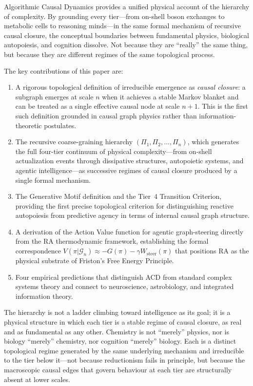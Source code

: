 \documentclass[11pt,a4paper]{article}
\theoremstyle{remark}
\newcommand{\GG}{\mathcal{G}}
\begin{document}
Algorithmic Causal Dynamics provides a unified physical account of the hierarchy
of complexity. By grounding every tier---from on-shell boson exchanges to
metabolic cells to reasoning minds---in the same formal mechanism of recursive
causal closure, the conceptual boundaries between fundamental physics, biological
autopoiesis, and cognition dissolve. Not because they are ``really'' the same
thing, but because they are different regimes of the same topological process.

The key contributions of this paper are:
\begin{enumerate}[noitemsep]
  \item A rigorous topological definition of irreducible emergence as
    \emph{causal closure}: a subgraph emerges at scale $n$ when it achieves a
    stable Markov blanket and can be treated as a single effective causal node
    at scale $n+1$. This is the first such definition grounded in causal graph
    physics rather than information-theoretic postulates.
  \item The recursive coarse-graining hierarchy $(\Pi_1, \Pi_2, \ldots, \Pi_n)$,
    which generates the full four-tier continuum of physical complexity---from
    on-shell actualization events through dissipative structures, autopoietic
    systems, and agentic intelligence---as successive regimes of causal closure
    produced by a single formal mechanism.
  \item The Generative Motif definition and the Tier~4 Transition Criterion,
    providing the first precise topological criterion for distinguishing reactive
    autopoiesis from predictive agency in terms of internal causal graph structure.
  \item A derivation of the Action Value function for agentic graph-steering
    directly from the RA thermodynamic framework, establishing the formal
    correspondence $V(\pi|\GG_n) \approx -G(\pi) - \gamma W_{\mathrm{steer}}(\pi)$
    that positions RA as the physical substrate of Friston's Free Energy Principle.
  \item Four empirical predictions that distinguish ACD from standard complex
    systems theory and connect to neuroscience, astrobiology, and integrated
    information theory.
\end{enumerate}

The hierarchy is not a ladder climbing toward intelligence as its goal; it is
a physical structure in which each tier is a stable regime of causal closure, as
real and as fundamental as any other. Chemistry is not ``merely'' physics, nor
is biology ``merely'' chemistry, nor cognition ``merely'' biology. Each is a
distinct topological regime generated by the same underlying mechanism and
irreducible to the tier below it---not because reductionism fails in principle,
but because the macroscopic causal edges that govern behaviour at each tier are
structurally absent at lower scales.
\end{document}
